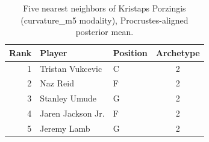 \begin{table}[htbp]
  \centering\small
  \begin{tabular}{rllc}
    \toprule
    Rank & Player & Position & Archetype \\
    \midrule
    1 & Tristan Vukcevic & C & 2 \\
    2 & Naz Reid & F & 2 \\
    3 & Stanley Umude & G & 2 \\
    4 & Jaren Jackson Jr. & F & 2 \\
    5 & Jeremy Lamb & G & 2 \\
    \bottomrule
  \end{tabular}
  \caption{Five nearest neighbors of Kristaps Porzingis (curvature_m5 modality), Procrustes-aligned posterior mean.}
  \label{tab:Kristaps_Porzingis_neighbors_curvature_m5}
\end{table}

